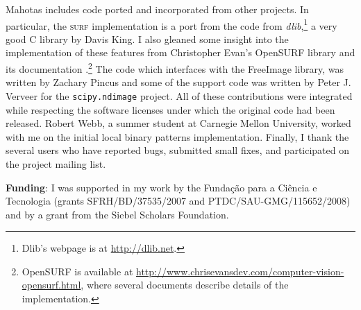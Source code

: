 \documentclass{article}
\newcommand*{\cpp}{{C\nolinebreak[4]\hspace{-.05em}\raisebox{.4ex}{\tiny\textbf{++}}}}
\let\code\texttt
\begin{document}
Mahotas includes code ported and incorporated from other projects. In
particular, the \textsc{surf} implementation is a port from the code from
\textit{dlib},\footnote{Dlib's webpage is at \url{http://dlib.net}.} a very
good \cpp{} library by Davis King. I also gleaned some insight into the
implementation of these features from Christopher Evan's OpenSURF library and
its documentation \citep{evans2009}.\footnote{OpenSURF is available at
\url{http://www.chrisevansdev.com/computer-vision-opensurf.html}, where several
documents describe details of the implementation.} The code which interfaces
with the FreeImage library, was written by Zachary Pincus and some of the
support code was written by Peter J. Verveer for the \code{scipy.ndimage}
project. All of these contributions were integrated while respecting the
software licenses under which the original code had been released. Robert Webb,
a summer student at Carnegie Mellon University, worked with me on the initial
local binary patterns implementation. Finally, I thank the several users who
have reported bugs, submitted small fixes, and participated on the project
mailing list.

\textbf{Funding}: I was supported in my work by the Funda\c c\~{a}o para a
Ci\^encia e Tecnologia (grants SFRH/BD/37535/2007 and PTDC/SAU-GMG/115652/2008)
and by a grant from the Siebel Scholars Foundation.

\printbibliography
\end{document}
